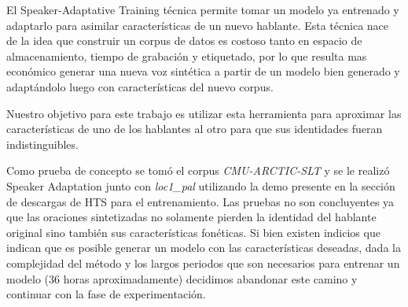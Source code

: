 El Speaker-Adaptative Training técnica permite tomar un modelo ya entrenado y adaptarlo para asimilar características de un nuevo hablante. Esta técnica nace de la idea que construir un corpus de datos es costoso tanto en espacio de almacenamiento, tiempo de grabación y etiquetado, por lo que resulta mas económico generar una nueva voz sintética a partir de un modelo bien generado y adaptándolo luego con características del nuevo corpus.

Nuestro objetivo para este trabajo es utilizar esta herramienta para aproximar las características de uno de los hablantes al otro para que sus identidades fueran indistinguibles.

Como prueba de concepto se tomó el corpus \textit{CMU-ARCTIC-SLT} y se le realizó Speaker Adaptation junto con \textit{loc1\_pal} utilizando la demo presente en la sección de descargas de HTS para el entrenamiento. Las pruebas no son concluyentes ya que las oraciones sintetizadas no solamente pierden la identidad del hablante original sino también sus características fonéticas. Si bien existen indicios que indican que es posible generar un modelo con las características deseadas, dada la complejidad del método y los largos periodos que son necesarios para entrenar un modelo ($36$ horas aproximadamente) decidimos abandonar este camino y continuar con la fase de experimentación.